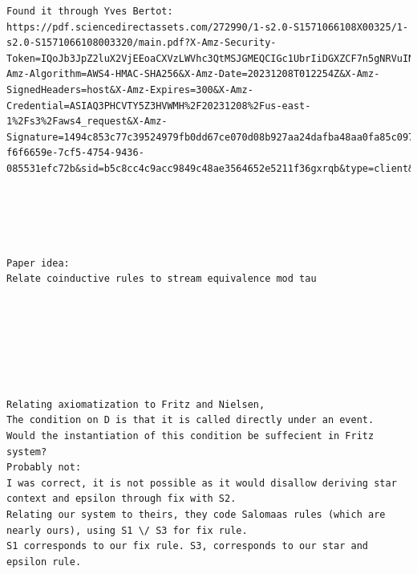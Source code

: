 \documentclass[a4paper,UKenglish,cleveref, autoref, thm-restate]{lipics-v2021}
\begin{document}
\begin{verbatim}
Found it through Yves Bertot:
https://pdf.sciencedirectassets.com/272990/1-s2.0-S1571066108X00325/1-s2.0-S1571066108003320/main.pdf?X-Amz-Security-Token=IQoJb3JpZ2luX2VjEEoaCXVzLWVhc3QtMSJGMEQCIGc1UbrIiDGXZCF7n5gNRVuINkU3S4mlnpM5okQ3sTVRAiALrKup1gjaRBffrva78Ixg9qXDnPs%2F2CG1BFd7hIqbeSq8BQiy%2F%2F%2F%2F%2F%2F%2F%2F%2F%2F8BEAUaDDA1OTAwMzU0Njg2NSIMYcc2NYeX89eN%2B%2FoAKpAFZ57wZJ6yUZyiYoVDuhWwDySYeAqiYH0WYCoVU%2FevWc5I5mO%2BfY4vtlRdSRKo4PD3C5Ul4W8rLltQeDMxqBb8KI06JuQpACv3YqgWW3ebtWtawrdAyXmlOeMC8GEHDX8v5RUqGTp94%2FSTgsyY4E%2BQ3NJoRp4xc1URBI5tEWLZ5l%2Fs%2Fbd8a9LPZcD93rSvm7bmGr1RC63xVE6BzwGQQuCFGFJqxkvjETROSxakQsQ5w%2BlRJg7weVNKVMu88Y8AydUato9RMhdiJ52gBxQOJm88RlYjEegY1C%2Bhrh0PzRDglZ7jsPBK%2BOV5XYPC5HImSTFkmDfWSlGFz9QUXmh6UD6qFAI3YX2XYmFYQBKjHKOzqcUNcym9Fd2FdARHbScnQ6H1%2F3%2F2sQlY41GVY2GvajdpVMxcjQApFQ%2FD8%2FBaqNhraj%2Bhr00B0yS6rzA0VxOY%2FIgFQQcZNKJwg1fnIkIIMEnxTJ3JWrrVj%2Bew8vvMlCKF%2FzpuxKL6w8VSJp5GW%2BFG2dTXujVJGHIUFcYqMu5m%2B6RsJv0vzlbRfQSUns5SHGMm5TTU8ALc%2BhMzwiYpgKJLC5bAghkas0kpQrk%2FHcwRpfZlRAjy8DVCjAZ34%2FP9E7hGKlAHvgSS3UjyQ8frXKrqShhmyXzw1riU7RPeA7spgnZRZ%2FZfNGZCwJLcSYsZEgsPNyY%2FhXX8Wc0coKx8eiuJt3BYqg2yeZUnnZGyhWKbXRNI1CTa8kZ6BJ6%2Bb%2BYLRWba42DniwtTO1kKW%2BB%2Ffa%2B3uRoyNSTKETqPlvtSLkFxJciz4Ejh1xj7irxBXinIRRbIr9IHaIUyGSkCUO%2BSFbdStnHgWe5mBB5PyvQQJFfqhzBEQTNIKiK3T7Os%2FXyFbc1xBx4wmN7JqwY6sgH9k4ABZt5KDdPr90Z5tEUqqgjMSzdJqxoFNXz1wpp%2BiwaA%2BqSjWOWUOT9owvwjuiUYRo%2FfbFEcZJ3ZX%2FwZUZdISL3bQW4%2BUR8NU2f498ZaSpg%2BQIVBl4Due95tfWJ8%2BzcX5JyCE6dY7LVmb7yIQFG1kGUhb18ktQS5JGqVTx0RmRKnpamp1ApNTBIOuSj9SE7sZSIYG4ddcZhsv8RguOk2Z6q5hDnTkP%2BeOFQN5h9up8S4&X-Amz-Algorithm=AWS4-HMAC-SHA256&X-Amz-Date=20231208T012254Z&X-Amz-SignedHeaders=host&X-Amz-Expires=300&X-Amz-Credential=ASIAQ3PHCVTY5Z3HVWMH%2F20231208%2Fus-east-1%2Fs3%2Faws4_request&X-Amz-Signature=1494c853c77c39524979fb0dd67ce070d08b927aa24dafba48aa0fa85c0972fe&hash=9c3daf9e2faf0f2c214a0e288c7a4a235f8cb58085d17f9610f3264c08b475db&host=68042c943591013ac2b2430a89b270f6af2c76d8dfd086a07176afe7c76c2c61&pii=S1571066108003320&tid=spdf-f6f6659e-7cf5-4754-9436-085531efc72b&sid=b5c8cc4c9acc9849c48ae3564652e5211f36gxrqb&type=client&tsoh=d3d3LnNjaWVuY2VkaXJlY3QuY29t&ua=010d585c5355505451&rr=8321332fee5123ad&cc=gb





Paper idea:
Relate coinductive rules to stream equivalence mod tau







Relating axiomatization to Fritz and Nielsen,
The condition on D is that it is called directly under an event.
Would the instantiation of this condition be suffecient in Fritz system?
Probably not: 
I was correct, it is not possible as it would disallow deriving star context and epsilon through fix with S2.
Relating our system to theirs, they code Salomaas rules (which are nearly ours), using S1 \/ S3 for fix rule.
S1 corresponds to our fix rule. S3, corresponds to our star and epsilon rule.



\end{verbatim}
\end{document}
